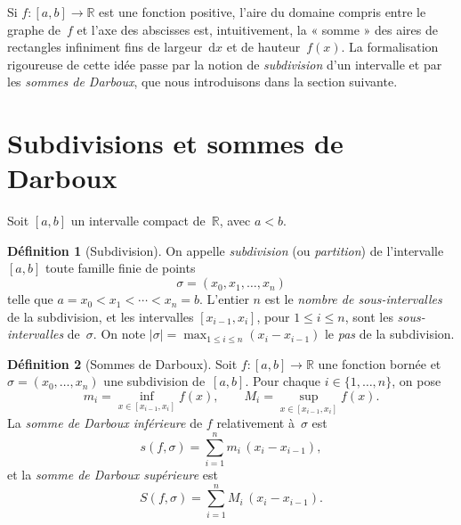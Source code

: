 \documentclass[12pt,a4paper,openany]{book}
\theoremstyle{definition}
\newtheorem{definition}{Définition}[chapter]
\newcommand{\R}{\mathbb{R}}
\newcommand{\abs}[1]{\left\lvert #1 \right\rvert}
\newcommand{\dd}{\mathrm{d}}
\begin{document}
Si $f \colon [a,b] \to \R$ est une fonction positive, l'aire du domaine compris entre le graphe de~$f$ et l'axe des abscisses est, intuitivement, la « somme » des aires de rectangles infiniment fins de largeur~$\dd x$ et de hauteur~$f(x)$. La formalisation rigoureuse de cette idée passe par la notion de \emph{subdivision} d'un intervalle et par les \emph{sommes de Darboux}, que nous introduisons dans la section suivante.

\section{Subdivisions et sommes de Darboux}
\label{sec:subdivisions-darboux}

Soit $[a,b]$ un intervalle compact de~$\R$, avec $a < b$.

\begin{definition}[Subdivision]\label{def:subdivision}
  On appelle \emph{subdivision} (ou \emph{partition}) de l'intervalle $[a,b]$ toute famille finie de points
  \[
    \sigma = (x_0, x_1, \ldots, x_n)
  \]
  telle que $a = x_0 < x_1 < \cdots < x_n = b$. L'entier $n$ est le \emph{nombre de sous-intervalles} de la subdivision, et les intervalles $[x_{i-1}, x_i]$, pour $1 \leqslant i \leqslant n$, sont les \emph{sous-intervalles} de~$\sigma$. On note $\abs{\sigma} = \max_{1 \leqslant i \leqslant n}(x_i - x_{i-1})$ le \emph{pas} de la subdivision.
\end{definition}

\begin{definition}[Sommes de Darboux]\label{def:sommes-darboux}
  Soit $f \colon [a,b] \to \R$ une fonction bornée et $\sigma = (x_0, \ldots, x_n)$ une subdivision de~$[a,b]$. Pour chaque $i \in \{1, \ldots, n\}$, on pose
  \[
    m_i = \inf_{x \in [x_{i-1}, x_i]} f(x), \qquad
    M_i = \sup_{x \in [x_{i-1}, x_i]} f(x).
  \]
  La \emph{somme de Darboux inférieure} de $f$ relativement à~$\sigma$ est
  \[
    s(f, \sigma) = \sum_{i=1}^{n} m_i \, (x_i - x_{i-1}),
  \]
  et la \emph{somme de Darboux supérieure} est
  \[
    S(f, \sigma) = \sum_{i=1}^{n} M_i \, (x_i - x_{i-1}).
  \]
\end{definition}
\end{document}
